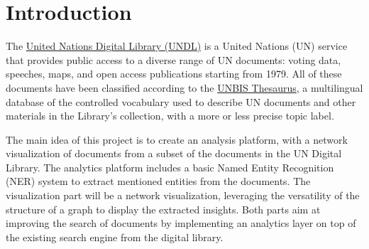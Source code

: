 
\section{Introduction} \label{sec:introduction}

The \href{https://digitallibrary.un.org/}{United Nations Digital Library (UNDL)} is a United Nations (UN) service that provides public access to a diverse range of UN documents: voting data, speeches, maps, and open access publications starting from 1979.
All of these documents have been classified according to the \href{https://metadata.un.org/thesaurus/about?lang=en}{UNBIS Thesaurus}, a multilingual database of the controlled vocabulary used to describe UN documents and other materials in the Library's collection, with a more or less precise topic label.


The main idea of this project is to create an analysis platform, with a network visualization of documents from a subset of the documents in the UN Digital Library. The analytics platform includes a basic Named Entity Recognition (NER) system to extract mentioned entities from the documents. The visualization part will be a network visualization, leveraging the versatility of the structure of a graph to display the extracted insights. Both parts aim at improving the search of documents by implementing an analytics layer on top of the existing search engine from the digital library.
